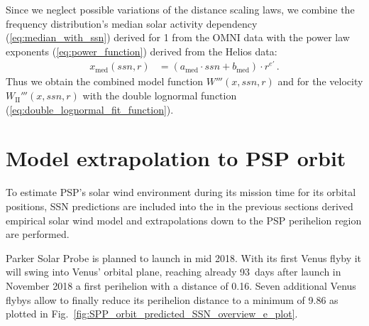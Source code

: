 Since we neglect possible variations of the distance scaling laws, we combine the frequency distribution’s median solar activity dependency (\ref{eq:median_with_ssn}) derived for \SI{1}{\au} from the OMNI data with the power law exponents (\ref{eq:power_function}) derived from the Helios data:
\begin{align}
	x_\text{med}(ssn,r) &= (a_\text{med} \cdot ssn + b_\text{med}) \cdot r^{e'}	\,.	\label{eq:general_sw_model}
\end{align}
Thus we obtain the combined model function $W'''(x,ssn,r)$ and for the velocity $W_\text{II}'''(x,ssn,r)$ with the double lognormal function (\ref{eq:double_lognormal_fit_function}).


\section{Model extrapolation to PSP orbit}
\label{sec:model_extrapolation_to_psp_orbit}
To estimate PSP’s solar wind environment during its mission time for its orbital positions, SSN predictions are included into the in the previous sections derived empirical solar wind model and extrapolations down to the PSP perihelion region are performed.

Parker Solar Probe is planned to launch in mid 2018. With its first Venus flyby it will swing into Venus' orbital plane, reaching already 93~days after launch in November 2018 a first perihelion with a distance of \SI{0.16}{\au}. Seven additional Venus flybys allow to finally reduce its perihelion distance to a minimum of \SI{9.86}{\Rs} \citep{Fox2015} as plotted in Fig.~\ref{fig:SPP_orbit_predicted_SSN_overview_e_plot}.

